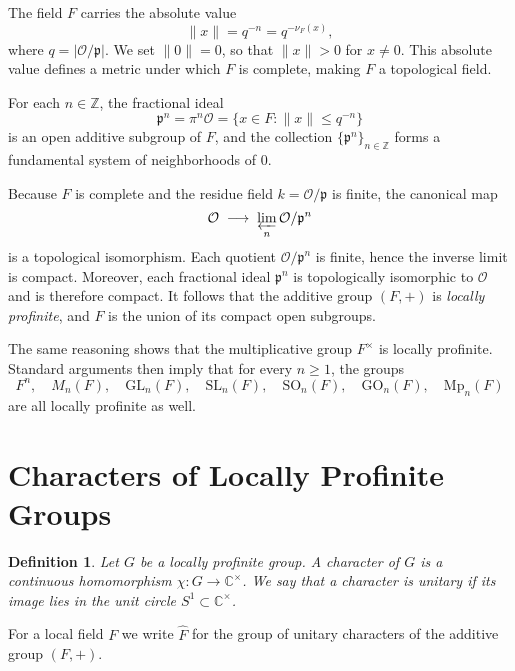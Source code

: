 \documentclass[11pt]{amsart}
\newtheorem{defn}{Definition}
\begin{document}
The field $F$ carries the absolute value
\[
\lVert x \rVert = q^{-n} = q^{-\nu_F(x)},
\]
where $q = \lvert \mathcal{O}/\mathfrak{p} \rvert$.
We set $\lVert 0 \rVert = 0$, so that $\lVert x \rVert > 0$ for $x \neq 0$.
This absolute value defines a metric under which $F$ is complete, making $F$ a topological field.

For each $n \in \mathbb{Z}$, the fractional ideal
\[
\mathfrak{p}^n
   = \pi^n \mathcal{O}
   = \{x \in F : \lVert x \rVert \le q^{-n}\}
\]
is an open additive subgroup of $F$, and the collection $\{\mathfrak{p}^n\}_{n \in \mathbb{Z}}$
forms a fundamental system of neighborhoods of $0$.

Because $F$ is complete and the residue field $k = \mathcal{O}/\mathfrak{p}$ is finite,
the canonical map
\[
\mathcal{O} \;\longrightarrow\; \varprojlim_{n} \mathcal{O}/\mathfrak{p}^n
\]
is a topological isomorphism.
Each quotient $\mathcal{O}/\mathfrak{p}^n$ is finite, hence the inverse limit is compact.
Moreover, each fractional ideal $\mathfrak{p}^n$ is topologically isomorphic to $\mathcal{O}$
and is therefore compact.
It follows that the additive group $(F,+)$ is \emph{locally profinite},
and $F$ is the union of its compact open subgroups.

The same reasoning shows that the multiplicative group $F^\times$ is locally profinite.
Standard arguments then imply that for every $n \ge 1$, the groups
\[
F^n,\quad M_n(F),\quad \mathrm{GL}_n(F),\quad
\mathrm{SL}_n(F),\quad
\mathrm{SO}_n(F),\quad
\mathrm{GO}_n(F),\quad
\mathrm{Mp}_n(F)
\]
are all locally profinite as well.


\section{Characters of Locally Profinite Groups}

\begin{defn}
    Let $G$ be a locally profinite group. A character of $G$ is a continuous homomorphism $\chi: G \to \mathbb{C}^\times$. We say that a character is unitary if its image lies in the unit circle $S^1 \subset \mathbb{C}^\times$.
\end{defn}

For a local field $F$ we write $\hat{F}$ for the group of unitary characters of the additive group $(F,+)$. 


\cite{BH06}




\nocite{}


\end{document}
